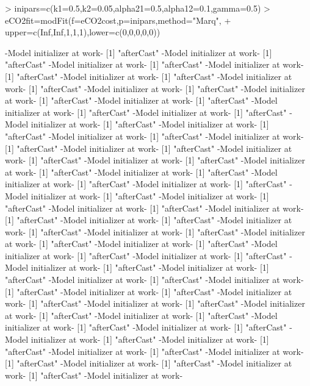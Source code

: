 \documentclass[a4paper]{article}
\begin{document}
\begin{Schunk}
\begin{Sinput}
> inipars=c(k1=0.5,k2=0.05,alpha21=0.5,alpha12=0.1,gamma=0.5)
> eCO2fit=modFit(f=eCO2cost,p=inipars,method="Marq",
+                upper=c(Inf,Inf,1,1,1),lower=c(0,0,0,0,0))
\end{Sinput}
\begin{Soutput}
-Model initializer at work-
[1] "afterCast"
-Model initializer at work-
[1] "afterCast"
-Model initializer at work-
[1] "afterCast"
-Model initializer at work-
[1] "afterCast"
-Model initializer at work-
[1] "afterCast"
-Model initializer at work-
[1] "afterCast"
-Model initializer at work-
[1] "afterCast"
-Model initializer at work-
[1] "afterCast"
-Model initializer at work-
[1] "afterCast"
-Model initializer at work-
[1] "afterCast"
-Model initializer at work-
[1] "afterCast"
-Model initializer at work-
[1] "afterCast"
-Model initializer at work-
[1] "afterCast"
-Model initializer at work-
[1] "afterCast"
-Model initializer at work-
[1] "afterCast"
-Model initializer at work-
[1] "afterCast"
-Model initializer at work-
[1] "afterCast"
-Model initializer at work-
[1] "afterCast"
-Model initializer at work-
[1] "afterCast"
-Model initializer at work-
[1] "afterCast"
-Model initializer at work-
[1] "afterCast"
-Model initializer at work-
[1] "afterCast"
-Model initializer at work-
[1] "afterCast"
-Model initializer at work-
[1] "afterCast"
-Model initializer at work-
[1] "afterCast"
-Model initializer at work-
[1] "afterCast"
-Model initializer at work-
[1] "afterCast"
-Model initializer at work-
[1] "afterCast"
-Model initializer at work-
[1] "afterCast"
-Model initializer at work-
[1] "afterCast"
-Model initializer at work-
[1] "afterCast"
-Model initializer at work-
[1] "afterCast"
-Model initializer at work-
[1] "afterCast"
-Model initializer at work-
[1] "afterCast"
-Model initializer at work-
[1] "afterCast"
-Model initializer at work-
[1] "afterCast"
-Model initializer at work-
[1] "afterCast"
-Model initializer at work-
[1] "afterCast"
-Model initializer at work-
[1] "afterCast"
-Model initializer at work-
[1] "afterCast"
-Model initializer at work-
[1] "afterCast"
-Model initializer at work-
[1] "afterCast"
-Model initializer at work-
[1] "afterCast"
-Model initializer at work-
[1] "afterCast"
-Model initializer at work-
[1] "afterCast"
-Model initializer at work-
[1] "afterCast"
-Model initializer at work-
[1] "afterCast"
-Model initializer at work-
[1] "afterCast"
-Model initializer at work-
[1] "afterCast"
-Model initializer at work-
[1] "afterCast"
-Model initializer at work-

\end{Soutput}
\end{Schunk}
\end{document}
